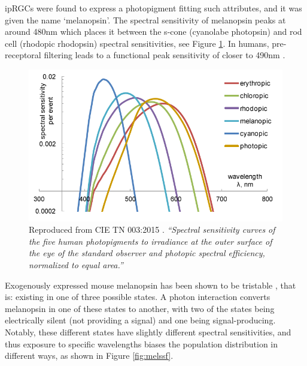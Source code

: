 \Glspl{ipRGC} were found to express a photopigment fitting such attributes, and it was given the name `melanopsin'. The spectral sensitivity of melanopsin peaks at around 480nm \citep{qiu_induction_2005,hankins_primary_2002,dacey_melanopsin-expressing_2005,peirson_melanopsin_2006,bailes_human_2013} which places it between the s-cone (cyanolabe photopsin) and rod cell (rhodopic rhodopsin) spectral sensitivities, see Figure \ref{fig:specsens}. In humans, pre-receptoral filtering leads to a functional peak sensitivity of closer to 490nm \citep{cie_cie_2015-1}. 

\begin{figure}[htbp]
\includegraphics[max width=\textwidth, center]{figs/LitRev/ciemel.png}
\caption{Reproduced from \gls{CIE} TN 003:2015 \citep{cie_cie_2015-1}. \textit{``Spectral sensitivity curves of the five human photopigments to irradiance at the outer surface of the eye of the standard observer and photopic spectral efficiency, normalized to equal area.''}}
\label{fig:specsens}
\end{figure}

Exogenously expressed mouse melanopsin has been shown to be tristable \citep{emanuel_melanopsin_2015,matsuyama_photochemical_2012-1}, that is: existing in one of three possible states. A photon interaction converts melanopsin in one of these states to another, with two of the states being electrically silent (not providing a signal) and one being signal-producing. Notably, these different states have slightly different spectral sensitivities, and thus exposure to specific wavelengths biases the population distribution in different ways, as shown in Figure \ref{fig:melssf}.

